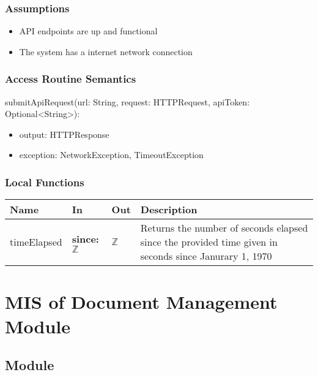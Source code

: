 \documentclass[12pt, titlepage]{article}
\begin{document}
\subsubsection{Assumptions}
\begin{itemize}
  \item API endpoints are up and functional
  \item The system has a internet network connection
\end{itemize}
\subsubsection{Access Routine Semantics}

\noindent submitApiRequest(url: String, request: HTTPRequest, apiToken:
Optional\textless String\textgreater):
\begin{itemize}
  \item output: HTTPResponse
  \item exception: NetworkException, TimeoutException
\end{itemize}

\subsubsection{Local Functions}

\begin{center}
  \begin{tabular}{>{\raggedright}p{3cm} >{\raggedright}p{5cm}
    >{\raggedright}p{4cm} p{4cm}}
    \hline
    \textbf{Name} & \textbf{In} & \textbf{Out} & \textbf{Description} \\
    \hline
    timeElapsed & \textbf{since:} $\mathbb{Z}$ & $\mathbb{Z}$ & Returns the
    number of seconds elapsed since the provided time given in seconds since
    Janurary 1, 1970 \\
    \hline
  \end{tabular}
\end{center}

\newpage

\section{MIS of Document Management Module} \label{Module}

\subsection{Module}
\end{document}
